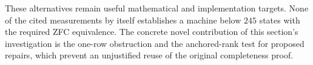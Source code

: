 These alternatives remain useful mathematical and implementation targets.
None of the cited measurements by itself establishes a machine below
$245$ states with the required ZFC equivalence. The concrete novel
contribution of this section's investigation is the one-row obstruction
and the anchored-rank test for proposed repairs, which prevent an
unjustified reuse of the original completeness proof.
